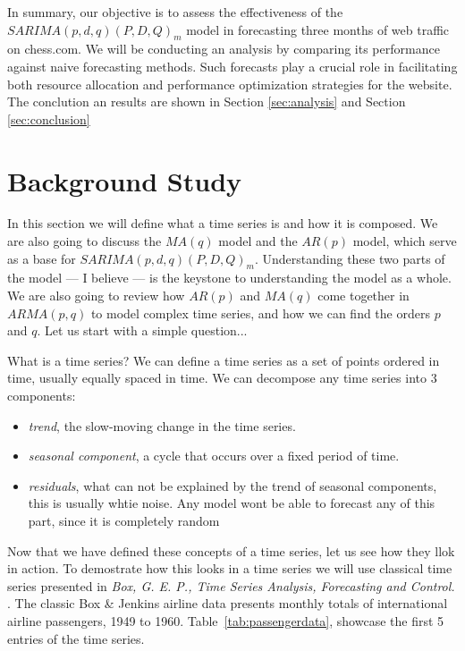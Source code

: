 \documentclass[journal]{IEEEtran}
\begin{document}
In summary, our objective is to assess the effectiveness of the
$SARIMA(p,d,q)(P,D,Q)_m$ model in forecasting three months of web traffic on
chess.com. We will be conducting an analysis by comparing its performance
against naive forecasting methods. Such forecasts play a crucial role in
facilitating both resource allocation and performance optimization strategies
for the website. The conclution an results are shown in Section
\ref{sec:analysis} and Section \ref{sec:conclusion}


\section{Background Study}\label{sec:back}
In this section we will define what a time series is and how it is composed.
We are also going to discuss the $MA(q)$ model and the $AR(p)$ model, which
serve as a base for $SARIMA(p,d,q)(P,D,Q)_m$. Understanding these two parts
of the model --- I believe --- is the keystone to understanding the model as a
whole. We are also going to review how $AR(p)$ and $MA(q)$ come together in
$ARMA(p,q)$ to model complex time series, and how we can find the orders $p$
and $q$. Let us start with a simple question...

What is a time series? We can define a time series as a set of points ordered
in time, usually equally spaced in time. \cite{timeseries} We can decompose
any time series into 3 components:

\begin{itemize}
    \item \emph{trend}, the slow-moving change in the time series.

    \item \emph{seasonal component}, a cycle that occurs over a fixed period
        of time.

    \item \emph{residuals}, what can not be explained by the trend of seasonal
        components, this is usually whtie noise. Any model wont be able to
        forecast any of this part, since it is completely random
\end{itemize}

Now that we have defined these concepts of a time series, let us see how they
llok in action. To demostrate how this looks in a time series we will use
classical time series presented in \emph{Box, G. E. P., Time Series Analysis,
Forecasting and Control.} \cite{airline}. The classic Box \& Jenkins airline
data presents monthly totals of international airline passengers, 1949 to
1960. Table~\ref{tab:passengerdata}, showcase the first 5 entries of the time
series.
\end{document}
